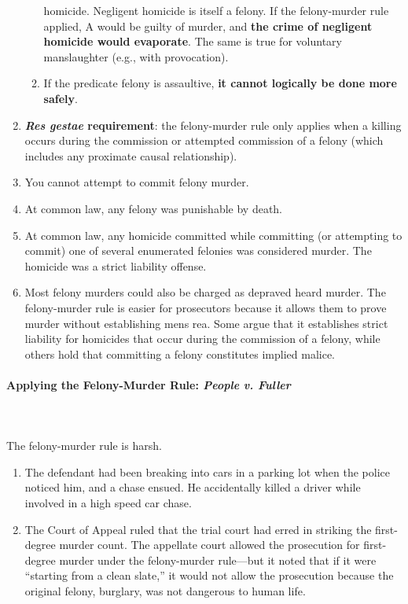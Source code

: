 \begin{enumerate}
\begin{enumerate}
        homicide. Negligent homicide is itself a felony. If the felony-murder 
        rule applied, A would be guilty of murder, and \textbf{the crime of 
        negligent homicide would evaporate}. The same is true for voluntary 
        manslaughter (e.g., with provocation).
        \item If the predicate felony is assaultive, \textbf{it cannot 
        logically be done more safely}.
    \end{enumerate}
    \item \textbf{\emph{Res gestae} requirement}: the felony-murder rule only 
    applies when a killing occurs during the commission or attempted 
    commission of a felony (which includes any proximate causal relationship).
    \item You cannot attempt to commit felony murder. %
    \item At common law, any felony was punishable by death.
    \item At common law, any homicide committed while committing (or 
    attempting to commit) one of several enumerated felonies was considered 
    murder. The homicide was a strict liability offense.
    \item Most felony murders could also be charged as depraved heard murder. 
    The felony-murder rule is easier for prosecutors because it allows them to 
    prove murder without establishing mens rea. Some argue that it establishes 
    strict liability for homicides that occur during the commission of a 
    felony, while others hold that committing a felony constitutes implied 
    malice.
\end{enumerate}

\paragraph{Applying the Felony-Murder Rule: \emph{People v. Fuller}} 
~\\\\
The felony-murder rule is harsh.

\begin{enumerate}
    \item The defendant had been breaking into cars in a parking lot when the 
    police noticed him, and a chase ensued. He accidentally killed a driver 
    while involved in a high speed car chase.
    \item The Court of Appeal ruled that the trial court had erred in striking 
    the first-degree murder count. The appellate court allowed the prosecution 
    for first-degree murder under the felony-murder rule---but it noted that 
    if it were ``starting from a clean slate,'' it would not allow the 
    prosecution because the original felony, burglary, was not dangerous to 
    human life.
\end{enumerate}


